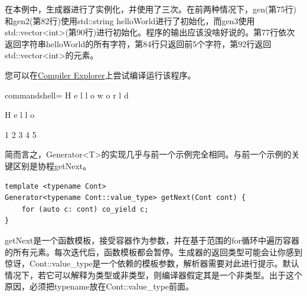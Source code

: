 在本例中，生成器进行了实例化，并使用了三次。在前两种情况下，gen(第75行)和gen2(第82行)使用std::string helloWorld进行了初始化，而gen3使用std::vector<int>(第90行)进行初始化。程序的输出应该没啥好说的。第77行依次返回字符串helloWorld的所有字符，第84行只返回前5个字符，第92行返回std::vector<int>的元素。

您可以在\href{https://godbolt.org/z/j9znva}{Compiler Explorer}上尝试编译运行该程序。

\begin{tcblisting}{commandshell={}}
H e l l o  w o r l d

H e l l o

1 2 3 4 5
\end{tcblisting}

简而言之，Generator<T>的实现几乎与前一个示例完全相同。与前一个示例的关键区别是协程getNext。

\begin{lstlisting}[style=styleCXX]
template <typename Cont>
Generator<typename Cont::value_type> getNext(Cont cont) {
	for (auto c: cont) co_yield c;
}
\end{lstlisting}

getNext是一个函数模板，接受容器作为参数，并在基于范围的for循环中遍历容器的所有元素。每次迭代后，函数模板都会暂停。生成器的返回类型可能会让你感到惊讶，Cont::value\_type是一个依赖的模板参数，解析器需要对此进行提示。默认情况下，若它可以解释为类型或非类型，则编译器假定其是一个非类型。出于这个原因，必须把typename放在Cont::value\_type前面。


\newpage












